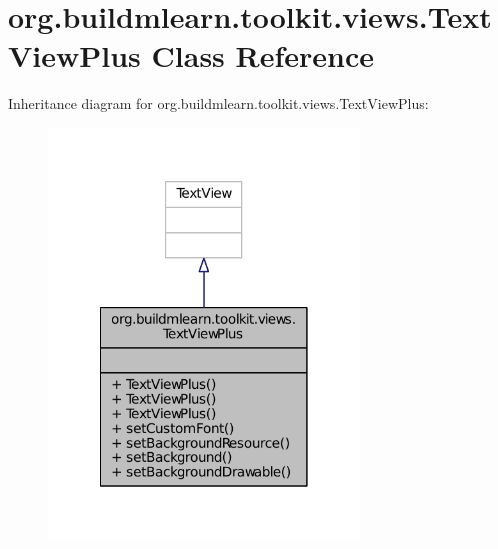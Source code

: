 \hypertarget{classorg_1_1buildmlearn_1_1toolkit_1_1views_1_1TextViewPlus}{\section{org.\-buildmlearn.\-toolkit.\-views.\-Text\-View\-Plus Class Reference}
\label{classorg_1_1buildmlearn_1_1toolkit_1_1views_1_1TextViewPlus}
}


Inheritance diagram for org.\-buildmlearn.\-toolkit.\-views.\-Text\-View\-Plus\-:
\nopagebreak
\begin{figure}[H]
\begin{center}
\leavevmode
\includegraphics[width=234pt]{db/d4d/classorg_1_1buildmlearn_1_1toolkit_1_1views_1_1TextViewPlus__inherit__graph}
\end{center}
\end{figure}



